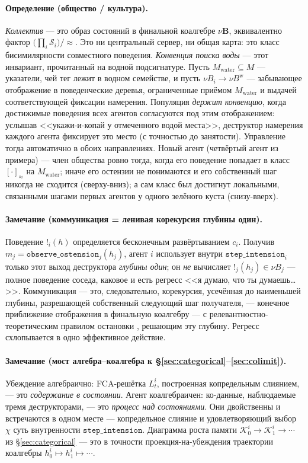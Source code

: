 \documentclass{article}
\newcommand{\method}[1]{\texttt{#1}}
\begin{document}
\paragraph{Определение (общество / культура).}
\emph{Коллектив} --- это образ состояний в финальной коалгебре
$\nu\mathbf{B}$, эквивалентно фактор
$\big(\prod_i\mathcal{S}_i\big)/\!\approx$. Это ни центральный сервер,
ни общая карта: это класс бисимилярности совместного поведения.
\emph{Конвенция поиска воды} --- этот инвариант, прочитанный на водной
подсигнатуре. Пусть $M_{\mathrm{water}}\subseteq M$ --- указатели, чей
тег лежит в водном семействе, и пусть
$\nu B_i\to\nu B^{\mathrm{w}}$ --- забывающее отображение в
поведенческие деревья, ограниченные приёмом $M_{\mathrm{water}}$ и
выдачей соответствующей фиксации намерения. Популяция \emph{держит
конвенцию}, когда достижимые поведения всех агентов согласуются под
этим отображением: услышав <<укажи-и-копай у отмеченного водой места>>,
деструктор намерения каждого агента фиксирует это место (с точностью до
занятости). Управление тогда автоматично в обоих направлениях. Новый
агент (четвёртый агент из примера) --- член общества ровно тогда, когда
его поведение попадает в класс $[\cdot]_{\approx}$ на
$M_{\mathrm{water}}$; иначе его остензии не понимаются и его собственный
шаг никогда не сходится (сверху-вниз); а сам класс был достигнут
локальными, связанными шагами первых агентов у одного зелёного куста
(снизу-вверх).

\paragraph{Замечание (коммуникация = ленивая корекурсия глубины один).}
Поведение $!_i(h)$ определяется бесконечным развёртыванием $c_i$.
Получив $m_j=\method{observe\_ostension}_j(h_j)$, агент $i$ использует
внутри $\method{step\_intension}_i$ только этот выход деструктора
\emph{глубины один}; он \emph{не} вычисляет $!_j(h_j)\in\nu B_j$ ---
полное поведение соседа, каковое и есть регресс <<я думаю, что ты
думаешь\ldots>>. Коммуникация --- это, следовательно, корекурсия,
усечённая до наименьшей глубины, разрешающей собственный следующий шаг
получателя, --- конечное приближение отображения в финальную коалгебру
--- с релевантностно-теоретическим правилом остановки
\citep{sperber1995relevance}, решающим эту глубину. Регресс схлопывается
в одно эффективное действие.

\paragraph{Замечание (мост алгебра--коалгебра к \S\ref{sec:categorical}--\ref{sec:colimit}).}
Убеждение алгебраично: FCA-решётка $L_t^i$, построенная копредельным
слиянием, --- это \emph{содержание в состоянии}. Агент коалгебраичен:
ко-данные, наблюдаемые тремя деструкторами, --- это \emph{процесс над
состояниями}. Они двойственны и встречаются в одном месте ---
копредельное слияние и удовлетворяющий выбор $\chi$ суть внутренности
$\method{step\_intension}$. Диаграмма роста памяти
$\mathcal{K}_0^i\to\mathcal{K}_1^i\to\cdots$ из \S\ref{sec:categorical}
--- это в точности проекция-на-убеждения траектории коалгебры
$h_0^i\mapsto h_1^i\mapsto\cdots$.
\end{document}
